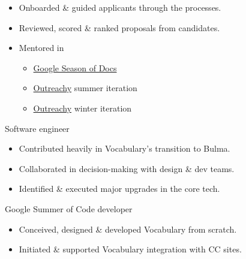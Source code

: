 \begin{sectiondescription}
  \begin{itemize}[nosep, leftmargin = *]
    \item Onboarded \& guided applicants through the processes.
    \item Reviewed, scored \& ranked proposals from candidates.
    \item Mentored in
    \begin{itemize}[nosep, leftmargin = *, label = {-}]
      \item \href{https://developers.google.com/season-of-docs}{Google Season of Docs} \hfill \textcolor{secondary}{}
      \item \href{https://outreachy.org/}{Outreachy} summer iteration \hfill \textcolor{secondary}{}
      \item \href{https://outreachy.org/}{Outreachy} winter iteration \hfill \textcolor{secondary}{}
    \end{itemize}
  \end{itemize}
\end{sectiondescription}

\rolesubsubsection
  {Software engineer}
  {}

\begin{sectiondescription}
  \begin{itemize}[nosep, leftmargin = *]
    \item Contributed heavily in Vocabulary's transition to Bulma.
    \item Collaborated in decision-making with design \& dev teams.
    \item Identified \& executed major upgrades in the core tech.
  \end{itemize}
\end{sectiondescription}

\rolesubsubsection
  {Google Summer of Code developer}
  {}

\begin{sectiondescription}
  \begin{itemize}[nosep, leftmargin = *]
    \item Conceived, designed \& developed Vocabulary from scratch.
    \item Initiated \& supported Vocabulary integration with CC sites.
  \end{itemize}
\end{sectiondescription}

